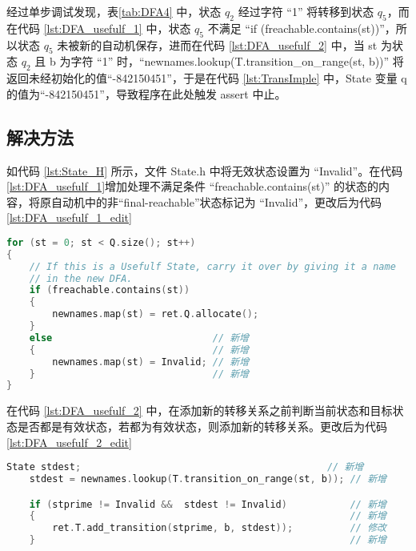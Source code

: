 经过单步调试发现，表\ref{tab:DFA4} 中，状态 $q_2$ 经过字符 “1” 将转移到状态 $q_5$，而在代码 \ref{lst:DFA_usefulf_1} 中，状态 $q_5$ 不满足 “if (freachable.contains(st))”，所以状态 $q_5$ 未被新的自动机保存，进而在代码 \ref{lst:DFA_usefulf_2} 中，当 st 为状态 $q_2$ 且 b 为字符 “1” 时，“newnames.lookup(T.transition\_on\_range(st, b))” 将返回未经初始化的值“-842150451”，于是在代码 \ref{lst:TransImple} 中，State 变量 q 的值为“-842150451”，导致程序在此处触发 assert 中止。

\subsection{解决方法}

如代码 \ref{lst:State_H} 所示，文件 State.h 中将无效状态设置为 “Invalid”。在代码 \ref{lst:DFA_usefulf_1}增加处理不满足条件 “freachable.contains(st)” 的状态的内容，将原自动机中的非“final-reachable”状态标记为 “Invalid”，更改后为代码 \ref{lst:DFA_usefulf_1_edit}

\begin{lstlisting}[language=C++,label={lst:DFA_usefulf_1_edit},caption={ 更改后的 DFA.cpp },firstnumber=91]
for (st = 0; st < Q.size(); st++)
{
    // If this is a Usefulf State, carry it over by giving it a name
    // in the new DFA.
    if (freachable.contains(st))
    {
        newnames.map(st) = ret.Q.allocate();
    }
    else                            // 新增
    {                               // 新增
        newnames.map(st) = Invalid; // 新增
    }                               // 新增
}
\end{lstlisting}

在代码 \ref{lst:DFA_usefulf_2} 中，在添加新的转移关系之前判断当前状态和目标状态是否都是有效状态，若都为有效状态，则添加新的转移关系。更改后为代码 \ref{lst:DFA_usefulf_2_edit}

\begin{lstlisting}[language=C++,label={lst:DFA_usefulf_2_edit},caption={ 更改后的 DFA.cpp },firstnumber=133]
    State stdest;                                           // 新增
    stdest = newnames.lookup(T.transition_on_range(st, b)); // 新增

    if (stprime != Invalid &&  stdest != Invalid)           // 新增
    {                                                       // 新增
        ret.T.add_transition(stprime, b, stdest));          // 修改
    }                                                       // 新增
\end{lstlisting}

